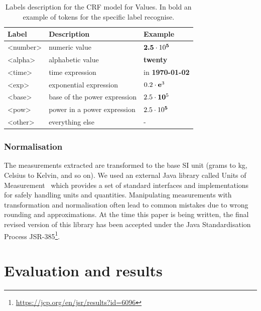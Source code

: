 \documentclass[sigconf]{acmart}
\begin{document}
\begin{table}[ht]
  \caption{Labels description for the CRF model for Values. In bold an example of tokens for the specific label recognise.}
  \label{tab:values-model-labels}
  \begin{tabular}{lll}
    \toprule
    Label & Description & Example\\
    \midrule
    <number> & numeric value & $\textbf{2.5}\cdot10\textsuperscript{\textbf{5}}$ \\
    <alpha> & alphabetic value & \textbf{twenty} \\
    <time> & time expression  & in \textbf{1970-01-02}\\
    <exp> & exponential expression & $0.2\cdot\textbf{e}\textsuperscript{3}$ \\
    <base> & base of the power expression & $2.5\cdot\textbf{10}\textsuperscript{5}$\\
    <pow> & power in a power expression & $2.5\cdot10\textsuperscript{\textbf{5}}$ \\
    <other> & everything else & - \\
  \bottomrule
\end{tabular}
\end{table}

\subsubsection{Normalisation}

The measurements extracted are transformed to the base SI unit (grams to kg, Celsius to Kelvin, and so on). We used an external Java library called Units of Measurement~\cite{units_of_measurement} which provides a set of standard interfaces and implementations for safely handling units and quantities. Manipulating measurements with transformation and normalisation often lead to common mistakes due to wrong rounding and approximations. At the time this paper is being written, the final revised version of this library has been accepted under the Java Standardisation Process JSR-385\footnote{\url{https://jcp.org/en/jsr/results?id=6096}}. 

\section{Evaluation and results}
\label{sec:results}
\end{document}
